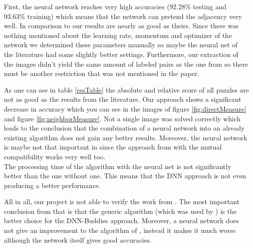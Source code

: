 \documentclass[11pt]{report}
\begin{document}
First, the neural network reaches very high accuracies (92.28\% testing and 93.63\% training) which means that the network can pretend the adjacency very well. In comparison to \cite{sholomon2016dnn} our results are nearly as good as theirs. Since there was nothing mentioned about the learning rate, momentum and optimizer of the network we determined these parameters manually so maybe the neural net of the literature had some slightly better settings. Furthermore, our extraction of the images didn't yield the same amount of labeled pairs as the one from \cite{sholomon2016dnn} so there must be another restriction that was not mentioned in the paper.

As one can see in table \ref{resTable} the absolute and relative score of all
puzzles are not as good as the results from the literature. Our approach shows a
significant decrease in accuracy which you can see in the images of figure
\ref{fig:directMeasure} and figure \ref{fig:neighborMeasure}.
Not a single image was solved correctly which leads to the conclusion that the combination of a neural network into an already existing algorithm does not gain any better results. Moreover, the neural network is maybe not that important in \cite{sholomon2016dnn} since the approach from \cite{Paikin2015} with the mutual compatibility works very well too.\\
The processing time of the algorithm with the neural net is not significantly
better than the one without one. This means that the DNN approach is not even
producing a better performance.

All in all, our project is not able to verify the work from \cite{sholomon2016dnn}. The most important conclusion from that is that the generic algorithm (which was used by \cite{sholomon2016dnn}) is the better choice for the DNN-Buddies approach. Moreover, a neural network does not give an improvement to the algorithm of \cite{Paikin2015}, instead it makes it much worse although the network itself gives good accuracies.



\end{document}
